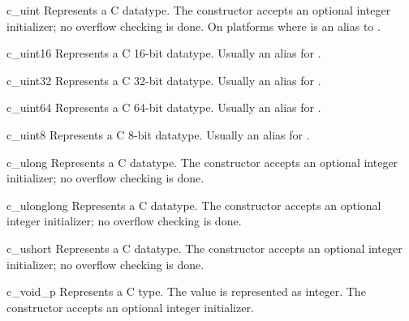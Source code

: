 \begin{classdesc}{c_uint}{}
Represents a C  datatype.  The constructor accepts
an optional integer initializer; no overflow checking is done.  On
platforms where   is an
alias to .
\end{classdesc}

\begin{classdesc}{c_uint16}{}
Represents a C 16-bit  datatype.  Usually an alias
for .
\end{classdesc}

\begin{classdesc}{c_uint32}{}
Represents a C 32-bit  datatype.  Usually an alias
for .
\end{classdesc}

\begin{classdesc}{c_uint64}{}
Represents a C 64-bit  datatype.  Usually an alias
for .
\end{classdesc}

\begin{classdesc}{c_uint8}{}
Represents a C 8-bit  datatype.  Usually an alias
for .
\end{classdesc}

\begin{classdesc}{c_ulong}{}
Represents a C  datatype.  The constructor accepts
an optional integer initializer; no overflow checking is done.
\end{classdesc}

\begin{classdesc}{c_ulonglong}{}
Represents a C  datatype.  The constructor
accepts an optional integer initializer; no overflow checking is done.
\end{classdesc}

\begin{classdesc}{c_ushort}{}
Represents a C  datatype.  The constructor accepts
an optional integer initializer; no overflow checking is done.
\end{classdesc}

\begin{classdesc}{c_void_p}{}
Represents a C  type.  The value is represented as
integer.  The constructor accepts an optional integer initializer.
\end{classdesc}

